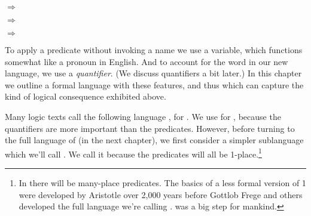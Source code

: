 \begin{menumerate}
	\item {} $\Rightarrow$ 
	\item {} $\Rightarrow$ 
	\item {} $\Rightarrow$ 	
\end{menumerate}

\noindent{}To apply a predicate without invoking a name we use a variable, which functions somewhat like a pronoun in English.  And to account for the word  in our new language, we use a \emph{quantifier}.  (We discuss quantifiers a bit later.)  In this chapter we outline a formal language with these features, and thus which can capture the kind of logical consequence exhibited above.

Many logic texts call the following language \PL{}, for . 
We use \mention{\QL{}} for , because the quantifiers are more important than the predicates. However, before turning to the full language of \GQL{} (in the next chapter), we first consider a simpler sublanguage which we'll call .  We call it  because the predicates will all be 1-place.\footnote{In \GQL{} there will be many-place predicates.  The basics of a less formal version of \GQL{}1 were developed by Aristotle over 2,000 years before Gottlob Frege and others developed the full language we're calling \GQL{}.  \GQL{} was a big step for mankind.}
 
